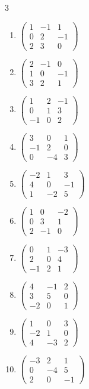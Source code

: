 \begin{multicols}{3}\raggedright
\begin{enumerate}[label=\arabic*.,  leftmargin=*]
\item $\begin{pmatrix}1&-1&1\\0&2&-1\\2&3&0\end{pmatrix}$
\item $\begin{pmatrix}2&-1&0\\1&0&-1\\3&2&1\end{pmatrix}$
\item $\begin{pmatrix}1&2&-1\\0&1&3\\-1&0&2\end{pmatrix}$
\item $\begin{pmatrix}3&0&1\\-1&2&0\\0&-4&3\end{pmatrix}$
\item $\begin{pmatrix}-2&1&3\\4&0&-1\\1&-2&5\end{pmatrix}$
\item $\begin{pmatrix}1&0&-2\\0&3&1\\2&-1&0\end{pmatrix}$
\item $\begin{pmatrix}0&1&-3\\2&0&4\\-1&2&1\end{pmatrix}$
\item $\begin{pmatrix}4&-1&2\\3&5&0\\-2&0&1\end{pmatrix}$
\item $\begin{pmatrix}1&0&3\\-2&1&0\\4&-3&2\end{pmatrix}$
\item $\begin{pmatrix}-3&2&1\\0&-4&5\\2&0&-1\end{pmatrix}$

\end{enumerate}
\end{multicols}
